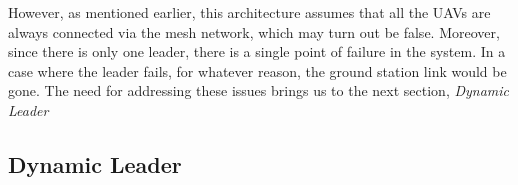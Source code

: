 However, as mentioned earlier, this architecture assumes that all the UAVs are always connected via the mesh network, which may turn out be false. Moreover, since there is only one leader, there is a single point of failure in the system. In a case where the leader fails, for whatever reason, the ground station link would be gone. The need for addressing these issues brings us to the next section, \textit{Dynamic Leader}

\subsection{Dynamic Leader}

